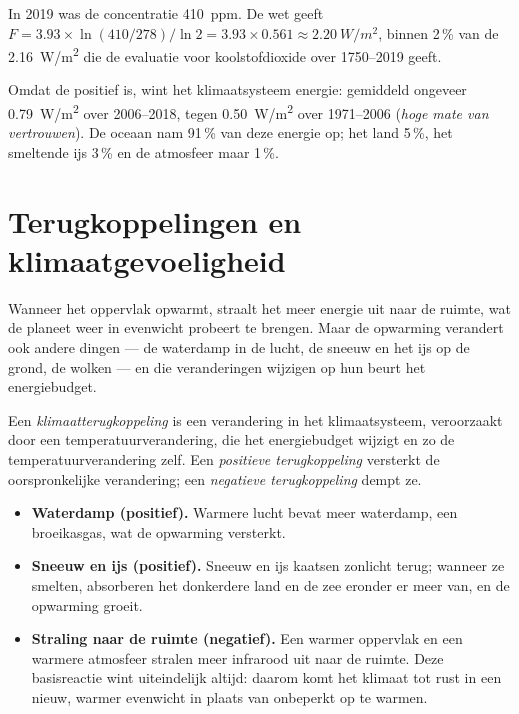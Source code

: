 \begin{example}\label{ex:g12:climate-change:check}
In 2019 was de concentratie \qty{410}{ppm}. De wet geeft
$F = 3.93 \times \ln(410/278)/\ln 2 = 3.93 \times 0.561 \approx
\qty{2.20}{W/m^2}$, binnen 2\,\% van de \qty{2.16}{W/m^2} die de
evaluatie voor koolstofdioxide over 1750--2019 geeft.
\end{example}

\begin{proposition}\label{prop:g12:climate-change:heating}
Omdat de  positief is, wint het klimaatsysteem energie: gemiddeld ongeveer
\qty{0.79}{W/m^2} over 2006--2018, tegen \qty{0.50}{W/m^2} over
1971--2006 (\emph{hoge mate van vertrouwen}). De oceaan nam 91\,\% van deze energie op; het
land 5\,\%, het smeltende ijs 3\,\% en de atmosfeer maar 1\,\%.
\end{proposition}

\section{Terugkoppelingen en klimaatgevoeligheid}

Wanneer het oppervlak opwarmt, straalt het meer energie uit naar de ruimte, wat de
planeet weer in evenwicht probeert te brengen. Maar de opwarming verandert ook andere
dingen --- de waterdamp in de lucht, de sneeuw en het ijs op de grond, de
wolken --- en die veranderingen wijzigen op hun beurt het energiebudget.

\begin{definition}[Klimaatterugkoppeling]\label{def:g12:climate-change:feedback}
Een \emph{klimaatterugkoppeling} is een verandering in het klimaatsysteem,
veroorzaakt door een temperatuurverandering, die het energiebudget wijzigt
en zo de temperatuurverandering zelf. Een \emph{positieve terugkoppeling} versterkt
de oorspronkelijke verandering; een \emph{negatieve terugkoppeling} dempt ze.
\end{definition}

\begin{example}\label{ex:g12:climate-change:three}
\begin{itemize}
  \item \textbf{Waterdamp (positief).} Warmere lucht bevat meer waterdamp,
        een broeikasgas, wat de opwarming versterkt.
  \item \textbf{Sneeuw en ijs (positief).} Sneeuw en ijs kaatsen zonlicht terug;
        wanneer ze smelten, absorberen het donkerdere land en de zee eronder er meer van,
        en de opwarming groeit.
  \item \textbf{Straling naar de ruimte (negatief).} Een warmer oppervlak en een warmere
        atmosfeer stralen meer infrarood uit naar de ruimte. Deze basisreactie
        wint uiteindelijk altijd: daarom komt het klimaat tot rust in een nieuw,
        warmer evenwicht in plaats van onbeperkt op te warmen.
\end{itemize}
\end{example}


